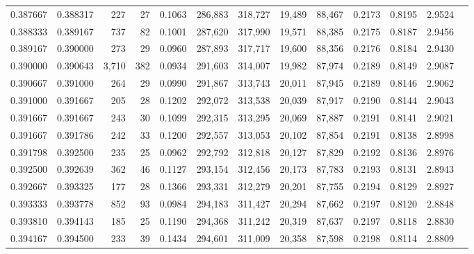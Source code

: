 \begin{tabular}{rrrrrrrrrrrrr}
0.387667 & 0.388317 &   227 &  27 &                                     0.1063 & 286,883 & 318,727 &  19,489 &  88,467 & 0.2173 & 0.8195 & 2.9524 \\
0.388333 & 0.389167 &   737 &  82 &                                     0.1001 & 287,620 & 317,990 &  19,571 &  88,385 & 0.2175 & 0.8187 & 2.9456 \\
0.389167 & 0.390000 &   273 &  29 &                                     0.0960 & 287,893 & 317,717 &  19,600 &  88,356 & 0.2176 & 0.8184 & 2.9430 \\
0.390000 & 0.390643 & 3,710 & 382 &                                     0.0934 & 291,603 & 314,007 &  19,982 &  87,974 & 0.2189 & 0.8149 & 2.9087 \\
0.390667 & 0.391000 &   264 &  29 &                                     0.0990 & 291,867 & 313,743 &  20,011 &  87,945 & 0.2189 & 0.8146 & 2.9062 \\
0.391000 & 0.391667 &   205 &  28 &                                     0.1202 & 292,072 & 313,538 &  20,039 &  87,917 & 0.2190 & 0.8144 & 2.9043 \\
0.391667 & 0.391667 &   243 &  30 &                                     0.1099 & 292,315 & 313,295 &  20,069 &  87,887 & 0.2191 & 0.8141 & 2.9021 \\
0.391667 & 0.391786 &   242 &  33 &                                     0.1200 & 292,557 & 313,053 &  20,102 &  87,854 & 0.2191 & 0.8138 & 2.8998 \\
0.391798 & 0.392500 &   235 &  25 &                                     0.0962 & 292,792 & 312,818 &  20,127 &  87,829 & 0.2192 & 0.8136 & 2.8976 \\
0.392500 & 0.392639 &   362 &  46 &                                     0.1127 & 293,154 & 312,456 &  20,173 &  87,783 & 0.2193 & 0.8131 & 2.8943 \\
0.392667 & 0.393325 &   177 &  28 &                                     0.1366 & 293,331 & 312,279 &  20,201 &  87,755 & 0.2194 & 0.8129 & 2.8927 \\
0.393333 & 0.393778 &   852 &  93 &                                     0.0984 & 294,183 & 311,427 &  20,294 &  87,662 & 0.2197 & 0.8120 & 2.8848 \\
0.393810 & 0.394143 &   185 &  25 &                                     0.1190 & 294,368 & 311,242 &  20,319 &  87,637 & 0.2197 & 0.8118 & 2.8830 \\
0.394167 & 0.394500 &   233 &  39 &                                     0.1434 & 294,601 & 311,009 &  20,358 &  87,598 & 0.2198 & 0.8114 & 2.8809 \\

\end{tabular}
